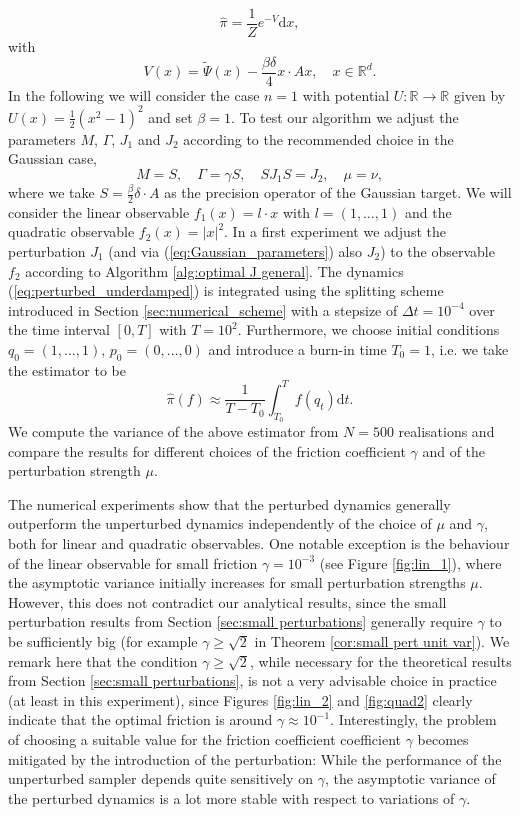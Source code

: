 \[
\widehat{\pi}=\frac{1}{Z}e^{-V}\mathrm{d}x,
\]
with 
\[
V(x)=\tilde{\Psi}(x)-\frac{\beta\delta }{4}x\cdot Ax,\quad x\in\mathbb{R}^{d}.
\]
In the following we will consider the case $n=1$ with potential $U:\mathbb{R}\rightarrow\mathbb{R}$
given by $U(x)=\frac{1}{2}(x^{2}-1)^{2}$ and set $\beta=1$. To test
our algorithm we adjust the parameters $M$, $\Gamma$, $J_{1}$ and
$J_{2}$ according to the recommended choice in the Gaussian case,
\begin{equation}
\label{eq:Gaussian_parameters}
M  = S, \quad
\Gamma =\gamma S, \quad
SJ_{1}S =J_{2}, \quad 
\mu =\nu,
\end{equation}
where we take $S=\frac{\beta}{2}\delta\cdot A$ as the precision
operator of the Gaussian target.  We will consider the linear observable
$f_{1}(x)=l\cdot x$ with $l=(1,\ldots,1)$ and the quadratic observable
$f_{2}(x)=\vert x\vert^{2}$. In a first experiment we adjust the
perturbation $J_{1}$ (and via (\ref{eq:Gaussian_parameters})
also $J_{2}$) to the observable $f_{2}$ according to Algorithm \ref{alg:optimal J general}.
The dynamics (\ref{eq:perturbed_underdamped}) is integrated
using the splitting scheme introduced in Section \ref{sec:numerical_scheme}
with a stepsize of $\Delta t=10^{-4}$ over the time interval $[0,T]$
with $T=10^{2}$. Furthermore, we choose initial conditions $q_0=(1,\ldots,1)$, $p_0=(0,\ldots,0)$  and introduce a burn-in time $T_{0}=1$,
i.e. we take the estimator to be 
\[
\hat{\pi}(f)\approx\frac{1}{T-T_{0}}\int_{T_{0}}^{T}f(q_{t})\mathrm{d}t.
\]
We compute the variance of the above estimator from $N=500$ realisations
and compare the results for different choices of the friction coefficient $\gamma$
and of the perturbation strength $\mu$. 

The numerical experiments show that the perturbed dynamics generally outperform
the unperturbed dynamics independently of the choice of $\mu$ and $\gamma$, both for linear and quadratic observables. One notable exception is the behaviour of the linear observable for small friction $\gamma = 10^{-3}$ (see Figure \ref{fig:lin_1}), where the asymptotic variance initially increases for small perturbation strengths $\mu$. However, this does not contradict our analytical results, since the small perturbation results from Section \ref{sec:small perturbations} generally require $\gamma$ to be sufficiently big (for example $\gamma\ge \sqrt{2}$ in Theorem \ref{cor:small pert unit var}). We remark here that the condition $\gamma\ge\sqrt{2}$, while necessary for the theoretical results from Section \ref{sec:small perturbations}, is not a very advisable choice in practice (at least in this experiment), since Figures \ref{fig:lin_2} and \ref{fig:quad2} clearly indicate that the optimal friction is around $\gamma \approx 10^{-1}$. Interestingly, the problem of choosing a suitable value for the friction coefficient coefficient $\gamma$ becomes mitigated by the introduction of the perturbation: While the performance of the unperturbed sampler depends quite sensitively on $\gamma$, the asymptotic variance of the perturbed dynamics is a lot more stable with respect to variations of $\gamma$. 

